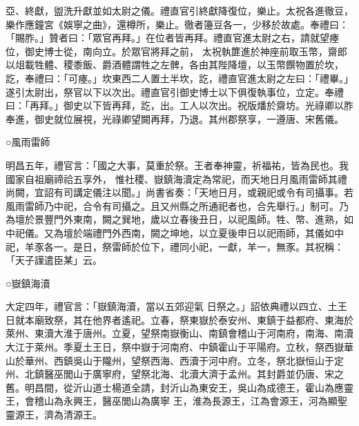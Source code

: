 \begin{pinyinscope}
 亞、終獻，盥洗升獻並如太尉之儀。禮直官引終獻降復位，樂止。太祝各進徹豆，樂作應鐘宮《娛寧之曲》，還樽所，樂止。徹者籩豆各一，少移於故處。奉禮曰：「賜胙。」贊者曰：「眾官再拜。」在位者皆再拜。禮直官進太尉之右，請就望瘞位，御史博士從，南向立。於眾官將拜之前，
 太祝執篚進於神座前取玉幣，齋郎以俎載牲體、稷黍飯、爵酒體謂牲之左髀，各由其陛降壇，以玉幣饌物置於坎，訖，奉禮曰：「可瘞。」坎東西二人置土半坎，訖，禮直官進太尉之左曰：「禮畢。」遂引太尉出，祭官以下以次出。禮直官引御史博士以下俱復執事位，立定。奉禮曰：「再拜。」御史以下皆再拜，訖，出。工人以次出。祝版燔於齋坊。光祿卿以胙奉進，御史就位展視，光祿卿望闕再拜，乃退。其州郡祭享，一遵唐、宋舊儀。



 ○風雨雷師



 明昌五年，禮官言：「國之大事，莫重於祭。王者奉神靈，祈福祐，皆為民也。我國家自祖廟禘祫五享外，
 惟社稷、嶽鎮海瀆定為常祀，而天地日月風雨雷師其禮尚闕，宜詔有司講定儀注以聞。」尚書省奏：「天地日月，或親祀或令有司攝事。若風雨雷師乃中祀，合令有司攝之。且又州縣之所通祀者也，合先舉行。」制可。乃為壇於景豐門外東南，闕之巽地，歲以立春後丑日，以祀風師。牲、幣、進熟，如中祀儀。又為壇於端禮門外西南，闕之坤地，以立夏後申日以祀雨師，其儀如中祀，羊豕各一。是日，祭雷師於位下，禮同小祀，一獻，羊一，無豕。其祝稱：「天子謹遣臣某」云。



 ○嶽鎮海瀆



 大定四年，禮官言：「嶽鎮海瀆，當以五郊迎氣
 日祭之。」詔依典禮以四立、土王日就本廟致祭，其在他界者遙祀。立春，祭東嶽於泰安州、東鎮于益都府、東海於萊州、東瀆大淮于唐州。立夏，望祭南嶽衡山、南鎮會稽山于河南府，南海、南瀆大江于萊州。季夏土王日，祭中嶽于河南府、中鎮霍山于平陽府。立秋，祭西嶽華山於華州、西鎮吳山于隴州，望祭西海、西瀆于河中府。立冬，祭北嶽恒山于定州、北鎮醫巫閭山于廣寧府，望祭北海、北瀆大濟于孟州。其封爵並仍唐、宋之舊。明昌間，從沂山道士楊道全請，封沂山為東安王，吳山為成德王，霍山為應靈王，會稽山為永興王，醫巫閭山為廣寧
 王，淮為長源王，江為會源王，河為顯聖靈源王，濟為清源王。




\end{pinyinscope}
